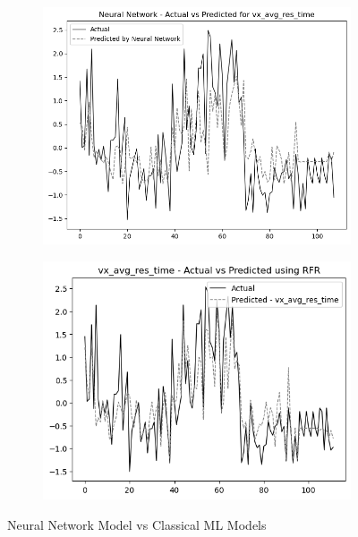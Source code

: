 \begin{figure}
    \begin{subfigure}[b]{0.49\textwidth}
        \centering
        \includegraphics[width=\linewidth]{images/nnCharts/all_data_visual_avg_response_time.png}
    \end{subfigure}\hfill
    \begin{subfigure}[b]{0.49\textwidth}
        \centering
        \includegraphics[width=\linewidth]{images/regressionCharts/all_data_visual_average_response_time.png}
    \end{subfigure}
    
    
    \caption{Neural Network Model vs Classical ML Models}
    \label{fig:nn_comparison}
\end{figure}



